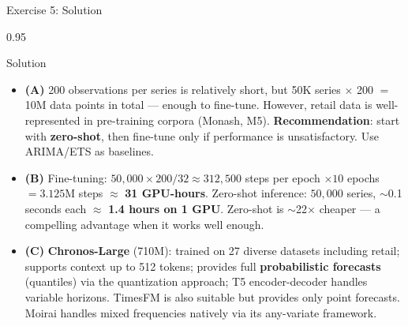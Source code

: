 \documentclass[9pt, aspectratio=169, t]{beamer}
\begin{document}
\begin{frame}{Exercise 5: Solution}
    \begin{cminipage}{0.95\textwidth}
    \begin{exampleblock}{Solution}
        {\footnotesize
        \begin{itemize}\setlength{\itemsep}{3pt}
            \item \textcolor{MainBlue}{\textbf{(A)}} 200 observations per series is relatively short, but 50K series $\times$ 200 $=$ 10M data points in total --- enough to fine-tune. However, retail data is well-represented in pre-training corpora (Monash, M5). \textbf{Recommendation}: start with \textbf{zero-shot}, then fine-tune only if performance is unsatisfactory. Use ARIMA/ETS as baselines.
            \item \textcolor{MainBlue}{\textbf{(B)}} Fine-tuning: $50{,}000 \times 200 / 32 \approx 312{,}500$ steps per epoch $\times 10$ epochs $= 3.125$M steps $\approx$ \textbf{31 GPU-hours}. Zero-shot inference: $50{,}000$ series, $\sim$0.1 seconds each $\approx$ \textbf{1.4 hours on 1 GPU}. Zero-shot is $\sim$22$\times$ cheaper --- a compelling advantage when it works well enough.
            \item \textcolor{MainBlue}{\textbf{(C)}} \textbf{Chronos-Large} (710M): trained on 27 diverse datasets including retail; supports context up to 512 tokens; provides full \textbf{probabilistic forecasts} (quantiles) via the quantization approach; T5 encoder-decoder handles variable horizons. TimesFM is also suitable but provides only point forecasts. Moirai handles mixed frequencies natively via its any-variate framework.
        \end{itemize}
        }
    \end{exampleblock}
    \end{cminipage}
\end{frame}
\end{document}
